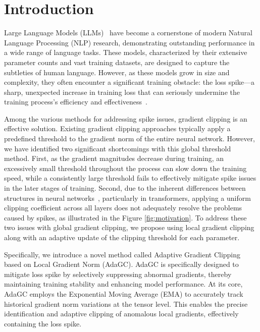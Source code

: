 \section{Introduction}
Large Language Models (LLMs)~\cite{brown2020language, chowdhery2023palm, touvron2023llama} have become a cornerstone of modern Natural Language Processing (NLP) research, demonstrating outstanding performance in a wide range of language tasks. These models, characterized by their extensive parameter counts and vast training datasets, are designed to capture the subtleties of human language. However, as these models grow in size and complexity, they often encounter a significant training obstacle: the loss spike—a sharp, unexpected increase in training loss that can seriously undermine the training process's efficiency and effectiveness~\cite{chowdhery2023palm, scao2022language, takase2023spike, zeng2022glm}.



Among the various methods for addressing spike issues, gradient clipping is an effective solution. Existing gradient clipping approaches \cite{pascanu2013difficulty} typically apply a predefined threshold to the gradient norm of the entire neural network. However, we have identified two significant shortcomings with this global threshold method. First, as the gradient magnitudes decrease during training, an excessively small threshold throughout the process can slow down the training speed, while a consistently large threshold fails to effectively mitigate spike issues in the later stages of training. Second, due to the inherent differences between structures in neural networks~\cite{zhang2024transformers}, particularly in transformers, applying a uniform clipping coefficient across all layers does not adequately resolve the problems caused by spikes, as illustrated in the Figure \ref{fig:motivation}. To address these two issues with global gradient clipping, we propose using local gradient clipping along with an adaptive update of the clipping threshold for each parameter.


Specifically, we introduce a novel method called Adaptive Gradient Clipping based on Local Gradient Norm (AdaGC). AdaGC is specifically designed to mitigate loss spike by selectively suppressing abnormal gradients, thereby maintaining training stability and enhancing model performance. At its core, AdaGC employs the Exponential Moving Average (EMA) to accurately track historical gradient norm variations at the tensor level. This enables the precise identification and adaptive clipping of anomalous local gradients, effectively containing the loss spike.




